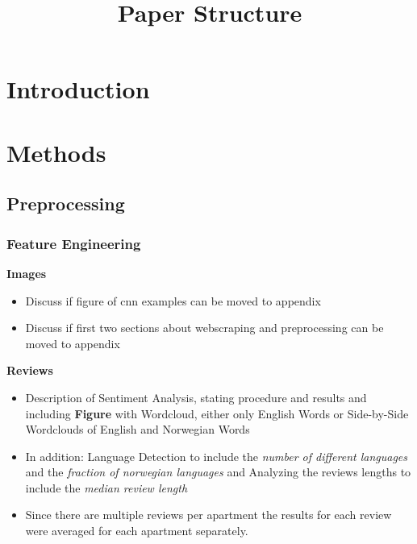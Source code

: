 \documentclass[12pt, letterpaper]{article}
\title{Paper Structure}
\author{}
\date{}
\begin{document}
\maketitle
\tableofcontents
\setcounter{tocdepth}{3}

\section{Introduction} %


\section{Methods} %


\subsection{Preprocessing} %

\subsubsection{Feature Engineering} %

\textbf{Images} %

\begin{itemize}
    \item Discuss if figure of cnn examples can be moved to appendix
    \item Discuss if first two sections about webscraping and preprocessing can be moved to appendix
\end{itemize}

\textbf{Reviews} %
\begin{itemize}
    \item Description of Sentiment Analysis, stating procedure and results and including \textbf{Figure} with Wordcloud, either only English Words or Side-by-Side Wordclouds of English and Norwegian Words
    \item In addition: Language Detection to include the \emph{number of different languages} and the \emph{fraction of norwegian languages} and Analyzing the reviews lengths to include the \emph{median review length}
    \item Since there are multiple reviews per apartment the results for each review were averaged for each apartment separately.
\end{itemize}
\end{document}
